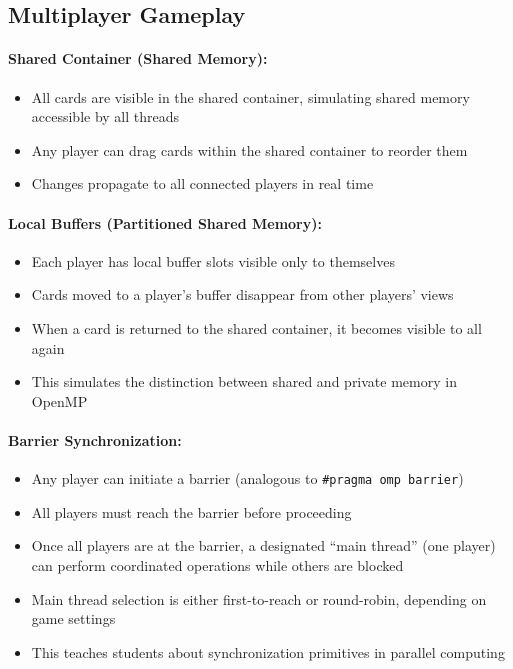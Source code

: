 \subsection{Multiplayer Gameplay}

\paragraph*{Shared Container (Shared Memory):}
\begin{itemize}
    \item All cards are visible in the shared container, simulating shared memory accessible by all threads
    \item Any player can drag cards within the shared container to reorder them
    \item Changes propagate to all connected players in real time
\end{itemize}

\paragraph*{Local Buffers (Partitioned Shared Memory):}
\begin{itemize}
    \item Each player has local buffer slots visible only to themselves
    \item Cards moved to a player's buffer disappear from other players' views
    \item When a card is returned to the shared container, it becomes visible to all again
    \item This simulates the distinction between shared and private memory in OpenMP
\end{itemize}

\paragraph*{Barrier Synchronization:}
\begin{itemize}
    \item Any player can initiate a barrier (analogous to \texttt{\#pragma omp barrier})
    \item All players must reach the barrier before proceeding
    \item Once all players are at the barrier, a designated ``main thread'' (one player) can perform coordinated operations while others are blocked
    \item Main thread selection is either first-to-reach or round-robin, depending on game settings
    \item This teaches students about synchronization primitives in parallel computing
\end{itemize}

